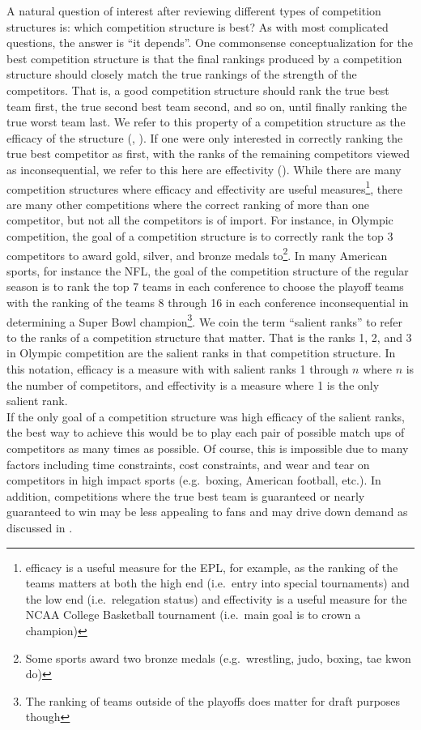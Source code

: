 \documentclass[
  12pt]{article}
\begin{document}
A natural question of interest after reviewing different types of
competition structures is: which competition structure is best? As with
most complicated questions, the answer is ``it depends''. One
commonsense conceptualization for the best competition structure is that
the final rankings produced by a competition structure should closely
match the true rankings of the strength of the competitors. That is, a
good competition structure should rank the true best team first, the
true second best team second, and so on, until finally ranking the true
worst team last. We refer to this property of a competition structure as
the efficacy of the structure (\citet{Lasek2018-de},
\citet{Sziklai2022-kf}). If one were only interested in correctly
ranking the true best competitor as first, with the ranks of the
remaining competitors viewed as inconsequential, we refer to this here
are effectivity (\citet{Glenn1960-mn}). While there are many competition
structures where efficacy and effectivity are useful
measures\footnote{efficacy is a useful measure for the EPL, for example,
  as the ranking of the teams matters at both the high end (i.e.~entry
  into special tournaments) and the low end (i.e.~relegation status) and
  effectivity is a useful measure for the NCAA College Basketball
  tournament (i.e.~main goal is to crown a champion)}, there are many
other competitions where the correct ranking of more than one
competitor, but not all the competitors is of import. For instance, in
Olympic competition, the goal of a competition structure is to correctly
rank the top 3 competitors to award gold, silver, and bronze medals
to\footnote{Some sports award two bronze medals (e.g.~wrestling, judo,
  boxing, tae kwon do)}. In many American sports, for instance the NFL,
the goal of the competition structure of the regular season is to rank
the top 7 teams in each conference to choose the playoff teams with the
ranking of the teams 8 through 16 in each conference inconsequential in
determining a Super Bowl champion\footnote{The ranking of teams outside
  of the playoffs does matter for draft purposes though}. We coin the
term ``salient ranks'' to refer to the ranks of a competition structure
that matter. That is the ranks 1, 2, and 3 in Olympic competition are
the salient ranks in that competition structure. In this notation,
efficacy is a measure with with salient ranks 1 through \(n\) where
\(n\) is the number of competitors, and effectivity is a measure where 1
is the only salient rank.\\

If the only goal of a competition structure was high efficacy of the
salient ranks, the best way to achieve this would be to play each pair
of possible match ups of competitors as many times as possible. Of
course, this is impossible due to many factors including time
constraints, cost constraints, and wear and tear on competitors in high
impact sports (e.g.~boxing, American football, etc.). In addition,
competitions where the true best team is guaranteed or nearly guaranteed
to win may be less appealing to fans and may drive down demand as
discussed in \citet{Johnson2022-wz}.
\end{document}
